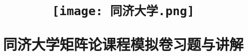 \def\myTitle{同济大学矩阵论课程模拟卷习题与讲解}
% 


\title{
    \begin{figure}[!h]
        \centering
        \texttt{[image: 同济大学.png]}
        \label{同济大学}
    \end{figure}

    {\Huge{\textbf{\myTitle}}}}
\author{}
\date{}
\maketitle




